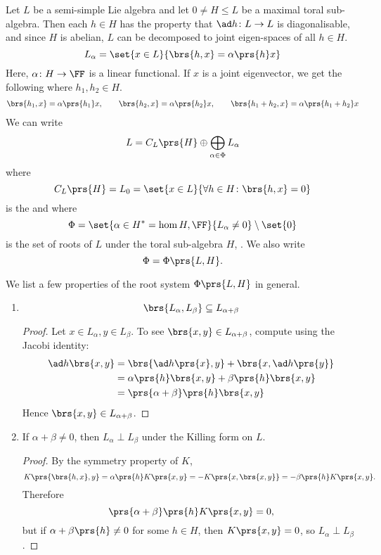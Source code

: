 \documentclass[10pt,a4paper,twoside,openany,hidelinks]{book}
\begin{document}
Let $L$ be a semi-simple Lie algebra and let $0 \neq H \leq L$ be a maximal toral sub-algebra. Then each $h \in H$ has the property that $\ad h \colon L \to L$ is diagonalisable, and since $H$ is abelian, $L$ can be decomposed to joint eigen-spaces of all $h \in H$.
\[L_{\alpha} = \set{x \in L}{\brs{h,x} = \alpha\prs{h}x}\]
Here, $\alpha \colon H \to \FF$ is a linear functional.
If $x$ is a joint eigenvector, we get the following where $h_1,h_2 \in H$.
\begin{align*}
\brs{h_1, x} = \alpha\prs{h_1}x, \qquad \brs{h_2,x} = \alpha\prs{h_2}x, \qquad \brs{h_1 + h_2, x} = \alpha\prs{h_1 + h_2}x
\end{align*}
We can write
\begin{align*}
L = C_L\prs{H} \oplus \bigoplus_{\alpha \in \Phi} L_{\alpha}
\end{align*}
where
\[C_L\prs{H} = L_0 = \set{x \in L}{\forall h \in H \colon \brs{h,x} = 0}\]
is the  and where
\[\Phi = \set{\alpha \in H^* = \hom{H,\FF}}{L_{\alpha} \neq 0} \setminus \set{0}\]
is the set of roots of $L$ under the toral sub-algebra $H$, . We also write
\[\Phi = \Phi\prs{L,H}\text{.}\]

We list a few properties of the root system $\Phi\prs{L,H}$ in general.

\begin{enumerate}[label = Property \arabic*.]
\item
\[\brs{L_{\alpha}, L_{\beta}} \subseteq L_{\alpha + \beta}\]
\begin{proof}
Let $x \in L_{\alpha}, y \in L_{\beta}$. To see $\brs{x,y} \in L_{\alpha + \beta}$, compute using the Jacobi identity:
\begin{align*}
\ad h \brs{x,y} &= \brs{\ad h\prs{x}, y} + \brs{x, \ad h \prs{y}} \\&=
\alpha\prs{h}\brs{x,y} + \beta\prs{h}\brs{x,y} \\&= \prs{\alpha + \beta}\prs{h} \brs{x,y}
\end{align*}
Hence $\brs{x,y} \in L_{\alpha + \beta}$.
\end{proof}
\item
If $\alpha + \beta \neq 0$, then $L_{\alpha} \perp L_{\beta}$ under the Killing form on $L$.
\begin{proof}
By the symmetry property of $K$,
\[K\prs{\brs{h,x},y} = \alpha\prs{h} K\prs{x,y} = -K\prs{x,\brs{x,y}} = -\beta\prs{h} K\prs{x,y} \text{.}\]
Therefore \[\prs{\alpha + \beta}\prs{h} K\prs{x,y} = 0 \text{,}\]
but if $\alpha + \beta\prs{h} \neq 0$ for some $h \in H$, then $K\prs{x,y} = 0$, so $L_{\alpha} \perp L_{\beta}$.
\end{proof}
\end{enumerate}
\end{document}
